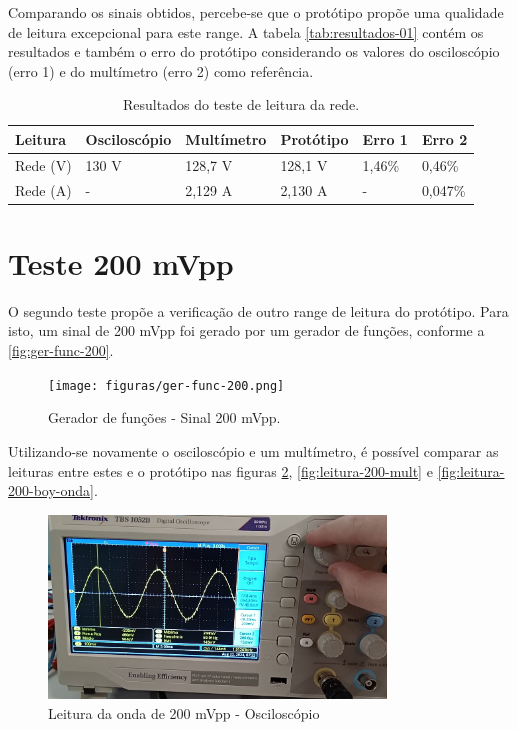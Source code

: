 Comparando os sinais obtidos, percebe-se que o protótipo propõe uma qualidade de leitura excepcional para este range. A tabela \autoref{tab:resultados-01} contém os resultados e também o erro do protótipo considerando os valores do osciloscópio (erro 1) e do multímetro (erro 2) como referência.

\begin{table}[!ht]
    \centering
    \caption{Resultados do teste de leitura da rede.}
    \label{tab:resultados-01}
    \begin{tabular}{|l|l|l|l|l|l|}
        \hline
        \textbf{Leitura} & \textbf{Osciloscópio} & \textbf{Multímetro} & \textbf{Protótipo}  & \textbf{Erro 1}  & \textbf{Erro 2}  \\ \hline
        Rede (V)         & 130 V                 & 128,7 V             & 128,1 V             & 1,46\%          & 0,46\%           \\ \hline
        Rede (A)         & -                     & 2,129 A             & 2,130 A             & -               & 0,047\%          \\ \hline
    \end{tabular}
\end{table}



\section{Teste 200 mVpp}\label{teste-200mv}

O segundo teste propõe a verificação de outro range de leitura do protótipo. Para isto, um sinal de 200 mVpp foi gerado por um gerador de funções, conforme a \autoref{fig:ger-func-200}.

\begin{figure}[htb!]
    \caption{Gerador de funções - Sinal 200 mVpp.}
    \label{fig:ger-func-200}
    \texttt{[image: figuras/ger-func-200.png]}
    \fonte{}
\end{figure}

Utilizando-se novamente o osciloscópio e um multímetro, é possível comparar as leituras entre estes e o protótipo nas figuras \ref{fig:leitura-200-osc}, \ref{fig:leitura-200-mult} e \ref{fig:leitura-200-boy-onda}.

\begin{figure}[htb!]
    \caption{Leitura da onda de 200 mVpp - Osciloscópio}
    \label{fig:leitura-200-osc}
    \includegraphics[width=0.8\textwidth]{figuras/leitura-200-osc.png}
    \fonte{}
\end{figure}

